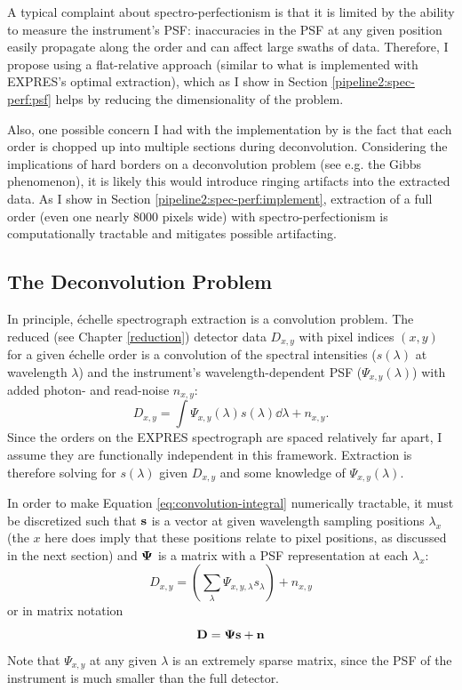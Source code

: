A typical complaint about spectro-perfectionism is that it is limited by the ability to measure the instrument's PSF: inaccuracies in the PSF at any given position easily propagate along the order and can affect large swaths of data. Therefore, I propose using a flat-relative approach (similar to what is implemented with EXPRES's optimal extraction), which as I show in Section \ref{pipeline2:spec-perf:psf} helps by reducing the dimensionality of the problem.

Also, one possible concern I had with the implementation by \citet{cornachione_full_2019} is the fact that each order is chopped up into multiple sections during deconvolution. Considering the implications of hard borders on a deconvolution problem (see e.g. the Gibbs phenomenon), it is likely this would introduce ringing artifacts into the extracted data. As I show in Section \ref{pipeline2:spec-perf:implement}, extraction of a full order (even one nearly 8000 pixels wide) with spectro-perfectionism is computationally tractable and mitigates possible artifacting.


\subsection{The Deconvolution Problem} \label{pipeline2:spec-perf:bkgd}

In principle, \'{e}chelle spectrograph extraction is a convolution problem. The reduced (see Chapter \ref{reduction}) detector data $D_{x,y}$ with pixel indices $(x, y)$ for a given \'{e}chelle order is a convolution of the spectral intensities ($s(\lambda)$ at wavelength $\lambda$) and the instrument's wavelength-dependent PSF ($\Psi_{x,y}(\lambda)$) with added photon- and read-noise $n_{x,y}$:
\begin{equation}
    D_{x,y} = \int \Psi_{x,y}(\lambda) s(\lambda) \dd{\lambda} + n_{x,y}.
\end{equation}
\label{eq:convolution-integral}
Since the orders on the EXPRES spectrograph are spaced relatively far apart, I assume they are functionally independent in this framework. Extraction is therefore solving for $s(\lambda)$ given $D_{x,y}$ and some knowledge of $\Psi_{x,y}(\lambda)$.

In order to make Equation \ref{eq:convolution-integral} numerically tractable, it must be discretized such that $\vb{s}$ is a vector at given wavelength sampling positions {$\lambda_x$} (the $x$ here does imply that these positions relate to pixel positions, as discussed in the next section) and $\vb{\Psi}$ is a matrix with a PSF representation at each $\lambda_x$:
\begin{equation}
    D_{x,y} = \left( \sum_\lambda \Psi_{x,y,\lambda} s_\lambda \right) + n_{x,y}
    \label{eq:convolution-index}
\end{equation}
or in matrix notation
\begin{equation}
    \vb{D} = \vb{\Psi}\vb{s} + \vb{n}
    \label{eq:convolution-matrix}
\end{equation}
Note that $\Psi_{x,y}$ at any given $\lambda$ is an extremely sparse matrix, since the PSF of the instrument is much smaller than the full detector.

